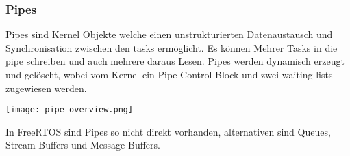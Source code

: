 \subsubsection{Pipes}

Pipes sind Kernel Objekte welche einen unstrukturierten Datenaustausch und Synchronisation zwischen den tasks ermöglicht.
Es können Mehrer Tasks in die pipe schreiben und auch mehrere daraus Lesen.
Pipes werden dynamisch erzeugt und gelöscht, wobei vom Kernel ein Pipe Control Block und zwei waiting lists zugewiesen werden.

\texttt{[image: pipe\_overview.png]}

In FreeRTOS sind Pipes so nicht direkt vorhanden, alternativen sind Queues, Stream Buffers und Message Buffers.